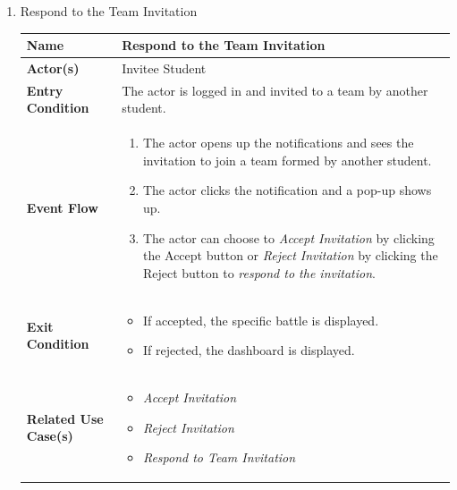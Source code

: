 \begin{enumerate}
\item Respond to the Team Invitation
\begin{center}
    \begin{tabular}{ | m{10em} | m{10cm}| } 
      \hline
      \textbf{Name} & Respond to the Team Invitation  \\ 
      \hline
      \textbf{Actor(s)} & Invitee Student \\ 
      \hline
      \textbf{Entry Condition} & The actor is logged in and invited to a team by another student.  \\ 
      \hline
      \textbf{Event Flow} & 
          \begin{enumerate}[(1)]
              \item The actor opens up the notifications and sees the invitation to join a team formed by another student.
              \item The actor clicks the notification and a pop-up shows up.
              \item The actor can choose to \textit{Accept Invitation} by clicking the Accept button or \textit{Reject Invitation} by clicking the Reject button to \textit{respond to the invitation}.
          \end{enumerate}
      \\ 
      \hline
      \textbf{Exit Condition} & 
      \begin{itemize}
          \item If accepted, the specific battle is displayed.
          \item If rejected, the dashboard is displayed.
      \end{itemize}\\ 
      \hline
      \textbf{Related Use Case(s)} & 
      \begin{itemize}
          \item \textit{Accept Invitation}
          \item \textit{Reject Invitation}
          \item \textit{Respond to Team Invitation}
      \end{itemize}
          \\ 
      \hline
    \end{tabular}
\end{center}



\newpage


\end{enumerate}
